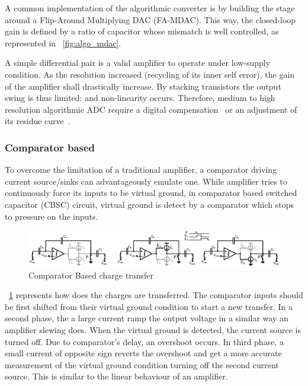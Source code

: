 A common implementation of the algorithmic converter is by building the stage around a Flip-Around Multiplying DAC (FA-MDAC). This way, the closed-loop gain is defined by a ratio of capacitor whose mismatch is well controlled, as represented in \figurename~\ref{fig:algo_mdac}. 

A simple differential pair is a valid amplifier to operate under low-supply condition. As the resolution increased (recycling of its inner self error), the gain of the amplifier shall drastically increase. By stacking transistors the output swing is thus limited: and non-linearity occurs. Therefore, medium to high resolution algorithmic ADC require a digital compensation~\cite{Murmann2003} or an adjustment of its residue curve~\cite{Inoue2017,Naderi2017}.

		\subsubsection{Comparator based}
To overcome the limitation of a traditional amplifier, a comparator driving current source/sinks can advantageously emulate one. While amplifier tries to continuously force its inputs to be virtual ground, in comparator based switched capacitor (CBSC) circuit, virtual ground is detect by a comparator which stops to pressure on the inputs.

\begin{figure}[htp]
	\centering
	\includegraphics[width=\textwidth]{algo_comp_based.ps}
	\caption{Comparator Based charge transfer}
	\label{fig:algo_comp_based}
\end{figure}

\figurename~\ref{fig:algo_comp_based} represents how does the charges are transferred. The comparator inputs should be first shifted from their virtual ground condition to start a new transfer. In a second phase, the a large current ramp the output voltage in a similar way an amplifier slewing does. When the virtual ground is detected, the current source is turned off. Due to comparator's delay, an overshoot occurs. In third phase, a small current of opposite sign reverts the overshoot and get a more accurate measurement of the virtual ground condition turning off the second current source. This is similar to the linear behaviour of an amplifier.

